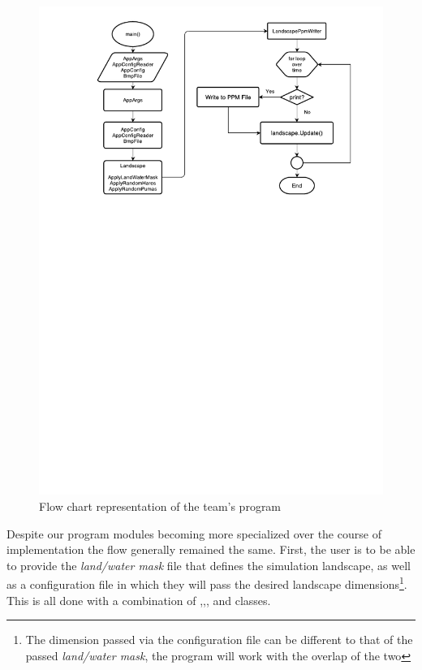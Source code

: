 \begin{figure}
   \begin{center}
      \includegraphics[width=\textwidth]{PS-Coursework-Flow.pdf}
   \end{center}
   \caption{Flow chart representation of the team's program }
   \label{fig:DesignFlowChart}
\end{figure}

Despite our program modules becoming more specialized over the course of implementation the flow generally remained the same. First, the user is to be able to provide the \textit{land/water mask} file that defines the simulation landscape, as well as a configuration file in which they will pass the desired landscape dimensions\footnote{The dimension passed via the configuration file can be different to that of the passed \textit{land/water mask}, the program will work with the overlap of the two}. This is all done with a combination of ,,, and  classes.  

